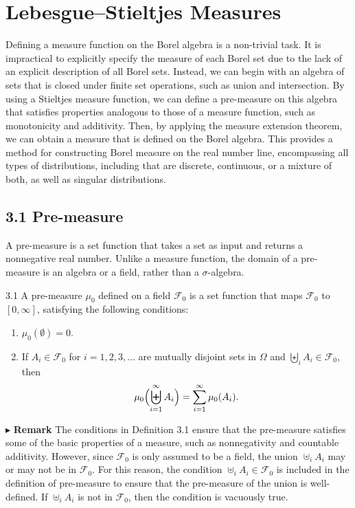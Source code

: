 \section*{Lebesgue--Stieltjes Measures}

Defining a measure function on the Borel algebra is a non-trivial task. It is impractical to explicitly specify the measure of each Borel set due to the lack of an explicit description of all Borel sets. Instead, we can begin with an algebra of sets that is closed under finite set operations, such as union and intersection. By using a Stieltjes measure function, we can define a pre-measure on this algebra that satisfies properties analogous to those of a measure function, such as monotonicity and additivity. Then, by applying the measure extension theorem, we can obtain a measure that is defined on the Borel algebra. This provides a method for constructing Borel measure on the real number line, encompassing all types of distributions, including that are discrete, continuous, or a mixture of both, as well as singular distributions.

\subsection*{3.1 Pre-measure}

A pre-measure is a set function that takes a set as input and returns a nonnegative real number. Unlike a measure function, the domain of a pre-measure is an algebra or a field, rather than a $\sigma$-algebra.

\begin{defbox}{3.1}
A pre-measure $\mu_0$ defined on a field $\mathcal{F}_0$ is a set function that maps $\mathcal{F}_0$ to $[0, \infty]$, satisfying the following conditions:
\begin{enumerate}[label=\arabic*.]
    \item $\mu_0(\emptyset) = 0$.
    \item If $A_i \in \mathcal{F}_0$ for $i = 1, 2, 3, \dots$ are mutually disjoint sets in $\Omega$ and $\biguplus_i A_i \in \mathcal{F}_0$, then
\[
\mu_0\Bigl(\biguplus_{i=1}^{\infty} A_i\Bigr) = \sum_{i=1}^{\infty} \mu_0(A_i).
\]
\end{enumerate}
\end{defbox}

\noindent$\blacktriangleright$ \textbf{Remark} The conditions in Definition 3.1 ensure that the pre-measure satisfies some of the basic properties of a measure, such as nonnegativity and countable additivity. However, since $\mathcal{F}_0$ is only assumed to be a field, the union $\uplus_i A_i$ may or may not be in $\mathcal{F}_0$. For this reason, the condition $\uplus_i A_i \in \mathcal{F}_0$ is included in the definition of pre-measure to ensure that the pre-measure of the union is well-defined. If $\uplus_i A_i$ is not in $\mathcal{F}_0$, then the condition is vacuously true.

